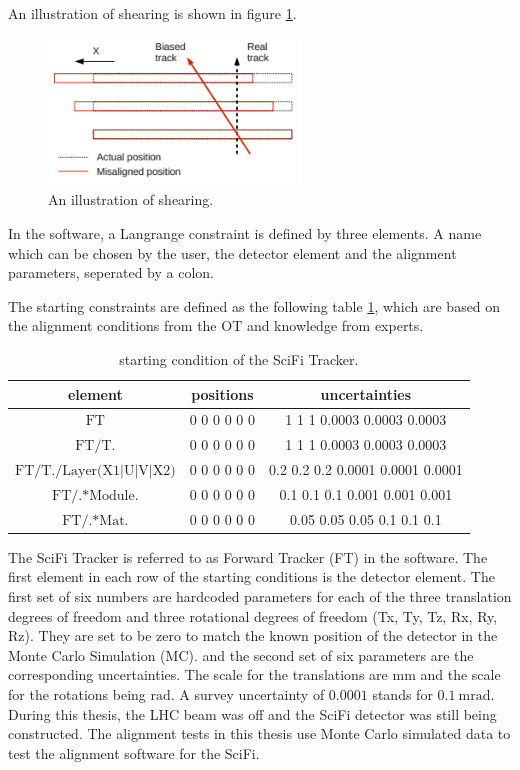 An illustration of shearing is shown in figure \ref{fig:shear}.

\begin{figure}
    \centering
    \includegraphics[width=0.6\textwidth]{plots/shearing.png}
    \caption{An illustration of shearing.}
    \label{fig:shear}
\end{figure}

In the software, a Langrange constraint is defined by three elements. A name which can be chosen by the user, the detector element and the alignment parameters, seperated by a colon.

The starting constraints are defined as the following table \ref{tab:cond}, which are based on the alignment conditions from the OT and knowledge from experts.
\begin{table}[!ht]
    \centering
    \begin{tabular}{c | c | c}
        \toprule
            element & positions & uncertainties \\
        \midrule
            $\text{FT}$ & 0 0 0 0 0 0 & 1 1 1 0.0003 0.0003 0.0003 \\
            $\text{FT/T.}$ & 0 0 0 0 0 0 & 1 1 1 0.0003 0.0003 0.0003 \\
            $\text{FT/T./Layer(X1|U|V|X2)}$ & 0 0 0 0 0 0 & 0.2 0.2 0.2 0.0001 0.0001 0.0001 \\
            $\text{FT/.*Module.}$ & 0 0 0 0 0 0 & 0.1 0.1 0.1 0.001 0.001 0.001 \\
            $\text{FT/.*Mat.}$ & 0 0 0 0 0 0 & 0.05 0.05 0.05 0.1 0.1 0.1 \\
        \bottomrule
    \end{tabular}
    \caption{starting condition of the SciFi Tracker.}
    \label{tab:cond}
\end{table}

The SciFi Tracker is referred to as Forward Tracker (FT) in the software.
The first element in each row of the starting conditions is the detector element.
The first set of six numbers are hardcoded parameters for each of the three translation degrees of freedom and three rotational degrees of freedom (Tx, Ty, Tz, Rx, Ry, Rz). They are set to be zero to match the known position of the detector in the Monte Carlo Simulation (MC).
and the second set of six parameters are the corresponding uncertainties.
The scale for the translations are $\si{\milli\metre}$ and the scale for the rotations being $\si{\radian}$. A survey uncertainty of $\num{0.0001}$ stands for $\SI{0.1}{\milli\radian}$.
During this thesis, the LHC beam was off and the SciFi detector was still being constructed. The alignment tests in this thesis use Monte Carlo simulated data to test the alignment software for the SciFi.

